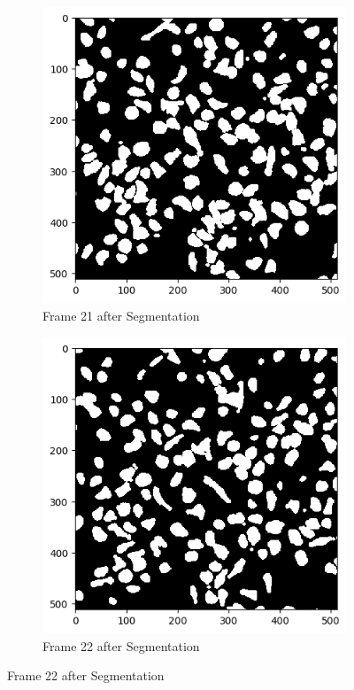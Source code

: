 \documentclass{article}
\begin{document}
\begin{figure}[h!]
  \begin{subfigure}{0.4\textwidth}
    \includegraphics[width=\linewidth]{Report/Appendix_Images/Segmentation-B-Growth/frame_21.png}
    \caption*{Frame 21 after Segmentation}
  \end{subfigure}
  \hfill
  \begin{subfigure}{0.4\textwidth}
    \includegraphics[width=\linewidth]{Report/Appendix_Images/Segmentation-B-Growth/frame_22.png}
    \caption*{Frame 22 after Segmentation}
  \end{subfigure}


\end{figure}
\end{document}

